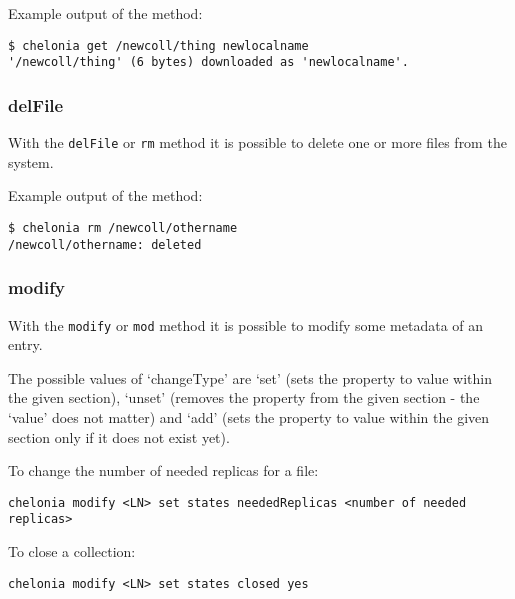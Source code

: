 Example output of the method:
\begin{verbatim}
$ chelonia get /newcoll/thing newlocalname
'/newcoll/thing' (6 bytes) downloaded as 'newlocalname'.
\end{verbatim}

\subsubsection{delFile} %
\label{ssub:delfile}
With the \texttt{delFile} or \texttt{rm} method it is possible to delete one or more files from the system.
\hspace*{0.5cm}
\begin{shaded}
\end{shaded}

Example output of the method:
\begin{verbatim}
$ chelonia rm /newcoll/othername
/newcoll/othername: deleted    
\end{verbatim}

\subsubsection{modify} %
\label{ssub:modify}

With the \texttt{modify} or \texttt{mod} method it is possible to modify some metadata of an entry.
\hspace*{0.5cm}
\begin{shaded}
\end{shaded}

The possible values of `changeType' are `set' (sets the property to value within the given section), `unset' (removes the property from the given section - the `value' does not matter) and `add' (sets the property to value within the given section only if it does not exist yet). 

To change the number of needed replicas for a file:
\begin{verbatim}
chelonia modify <LN> set states neededReplicas <number of needed replicas>    
\end{verbatim}

To close a collection:
\begin{verbatim}
chelonia modify <LN> set states closed yes    
\end{verbatim}

